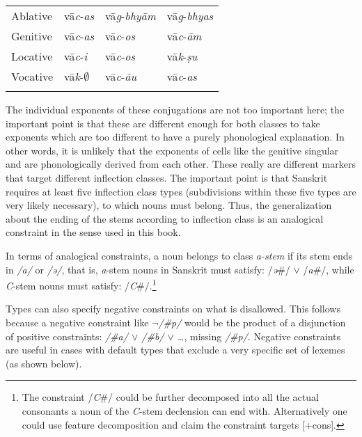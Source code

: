 \begin{table}
\begin{tabular}{llll}
      Ablative     & vā\textit{c}-\textit{as}          & vā\textit{g}-\textit{bhyām} & vā\textit{g}-\textit{bhyas} \\
      Genitive     & vā\textit{c}-\textit{as}          & vā\textit{c}-\textit{os}    & vā\textit{c}-\textit{ām}    \\
      Locative     & vā\textit{c}-\textit{i }          & vā\textit{c}-\textit{os}    & vā\textit{k}-\textit{ṣu}    \\
      Vocative     & vā\textit{k}-$\emptyset$ & vā\textit{c}-\textit{āu}    & vā\textit{c}-\textit{as}    \\
      \lspbottomrule
    \end{tabular}
\end{table}

The individual exponents of these conjugations are not too important here; the important point is that these are different enough for both classes to take exponents which are too different to have a purely phonological explanation. In other words, it is unlikely that the exponents of cells like the genitive singular  and  are phonologically derived from each other. These really are different markers that target different inflection classes. The important point is that Sanskrit requires at least five inflection class types (subdivisions within these five types are very likely necessary), to which nouns must belong. Thus, the generalization about the ending of the stems according to inflection class is an analogical constraint in the sense used in this book.

In terms of analogical constraints, a noun belongs to class \textit{a-stem} if its stem ends in \textit{/a/} or \textit{/ə/}, that is, \textit{a}-stem nouns in Sanskrit must satisfy: /\textit{ə}\#/ $\lor$ /\textit{a}\#/, while \textit{C}-stem nouns must satisfy: /\textit{C}\#/.\footnote{The constraint /\textit{C}\#/ could be further decomposed into all the actual consonants a noun of the \textit{C}-stem declension can end with. Alternatively one could use feature decomposition and claim the constraint targets [+cons].}

Types can also specify negative constraints on what is disallowed. This follows because a negative constraint like \textit{$\lnot$/\#p/} would be the product of a disjunction of positive constraints: \textit{/\#a/ $\lor$ /\#b/ $\lor$ \dots}, missing \textit{/\#p/}. Negative constraints are useful in cases with default types that exclude a very specific set of lexemes (as shown below). 

